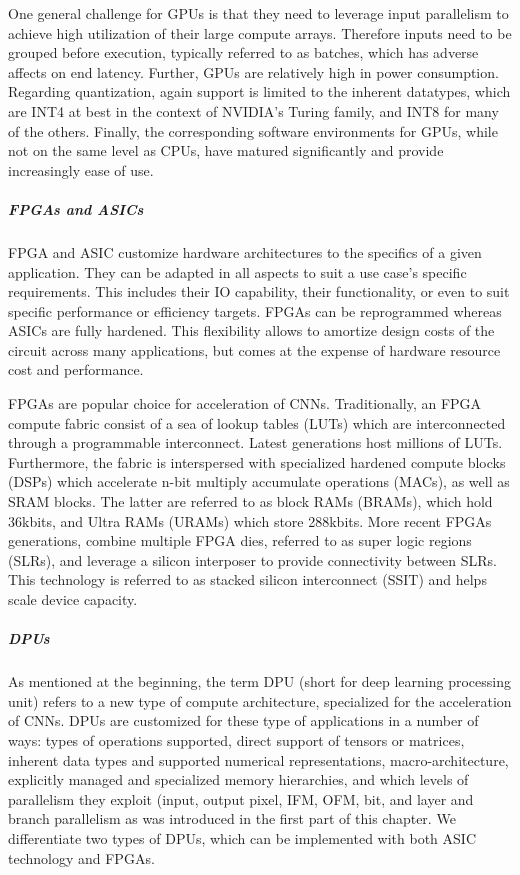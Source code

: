 One general challenge for GPUs is that they need to leverage input parallelism to achieve high utilization of their large compute arrays. Therefore inputs need to be grouped before execution, typically referred to as batches, which has adverse affects on end latency. 
Further, GPUs are relatively high in power consumption.
Regarding quantization, again support is limited to the inherent datatypes, which are INT4 at best in the context of NVIDIA's Turing family, and INT8 for many of the others.
Finally, the corresponding software environments for GPUs, while not on the same level as CPUs, have matured significantly and provide increasingly ease of use.

\subparagraph{FPGAs and ASICs}
FPGA and ASIC customize hardware architectures to the specifics of a given application.
They can be adapted in all aspects to suit a use case's specific requirements.
This includes their IO capability, their functionality, or even to suit specific performance or efficiency targets. 
FPGAs can be reprogrammed whereas ASICs are fully hardened.
This flexibility allows to amortize design costs of the circuit across many applications, but comes at the expense of hardware resource cost and performance.

FPGAs are popular choice for acceleration of CNNs. 
Traditionally, an FPGA compute fabric consist of a sea of lookup tables (LUTs) which are interconnected through a programmable interconnect. Latest generations host millions of LUTs. Furthermore, the fabric is interspersed with specialized hardened compute blocks (DSPs) which accelerate n-bit multiply accumulate operations (MACs), as well as SRAM blocks. The latter are referred to as block RAMs (BRAMs), which hold 36kbits, and Ultra RAMs (URAMs) which store 288kbits.
More recent FPGAs generations, combine multiple FPGA dies, referred to as super logic regions (SLRs), and leverage a silicon interposer to provide connectivity between SLRs. 
This technology is referred to as stacked silicon interconnect (SSIT) and helps scale device capacity.

\subparagraph{DPUs} As mentioned at the beginning, the term DPU (short for deep learning processing unit) refers to a new type of compute architecture, specialized for the acceleration of CNNs. 
DPUs are customized for these type of applications in a number of ways: types of operations supported, direct support of tensors or matrices, inherent data types and supported numerical representations, macro-architecture, explicitly managed and specialized memory hierarchies, and which levels of parallelism they exploit (input, output pixel, IFM, OFM, bit, and layer and branch parallelism as was introduced in the first part of this chapter.
We differentiate two types of DPUs, which can be implemented with both ASIC technology and FPGAs.

